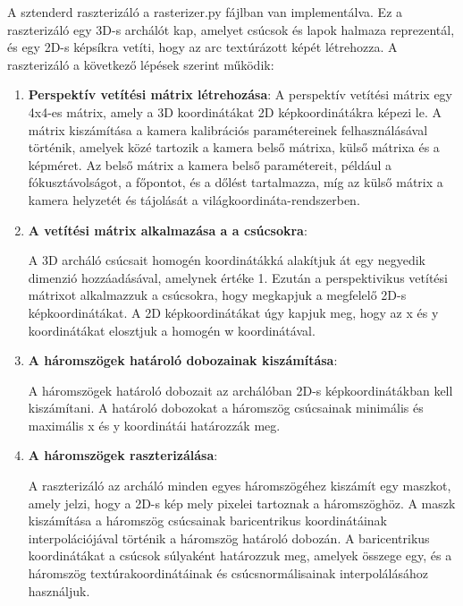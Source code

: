 \documentclass[12pt,a4]{article}
\begin{document}
             A sztenderd raszterizáló a rasterizer.py fájlban van implementálva.
             Ez a raszterizáló egy 3D-s archálót kap, amelyet csúcsok és lapok halmaza reprezentál, és egy 2D-s képsíkra vetíti, hogy az arc textúrázott képét létrehozza.
             A raszterizáló a következő lépések szerint működik:
             \begin{enumerate}
                 \item \textbf{Perspektív vetítési mátrix létrehozása}:
                        A perspektív vetítési mátrix egy 4x4-es mátrix, amely a 3D koordinátákat 2D képkoordinátákra képezi le. 
            	        A mátrix kiszámítása a kamera kalibrációs paramétereinek felhasználásával történik, amelyek közé tartozik a kamera belső mátrixa, külső mátrixa és a képméret. 
                        Az belső mátrix a kamera belső paramétereit, például a fókusztávolságot, a főpontot, 
                        és a dőlést tartalmazza, míg az külső mátrix a kamera helyzetét és tájolását a világkoordináta-rendszerben.
                 
                 \item \textbf{A vetítési mátrix alkalmazása a a csúcsokra}:
         
                        A 3D archáló csúcsait homogén koordinátákká alakítjuk át egy negyedik dimenzió hozzáadásával, amelynek értéke 1. 
                    	Ezután a perspektivikus vetítési mátrixot alkalmazzuk a csúcsokra, hogy megkapjuk a megfelelő 2D-s képkoordinátákat. 
                    	A 2D képkoordinátákat úgy kapjuk meg, hogy az x és y koordinátákat elosztjuk a homogén w koordinátával.
     
                 \item \textbf{A háromszögek határoló dobozainak kiszámítása}:
         
                        A háromszögek határoló dobozait az archálóban 2D-s képkoordinátákban kell kiszámítani.
                    	A határoló dobozokat a háromszög csúcsainak minimális és maximális x és y koordinátái határozzák meg.
     
                 \item \textbf{A háromszögek raszterizálása}:
         
                        A raszterizáló az archáló minden egyes háromszögéhez kiszámít egy maszkot, amely jelzi, hogy a 2D-s kép mely pixelei tartoznak a háromszöghöz. 
                        A maszk kiszámítása a háromszög csúcsainak baricentrikus koordinátáinak interpolációjával történik a háromszög határoló dobozán.
                    	A baricentrikus koordinátákat a csúcsok súlyaként határozzuk meg, amelyek összege egy, és a háromszög textúrakoordinátáinak és csúcsnormálisainak interpolálásához használjuk.
     

\end{enumerate}
\end{document}
